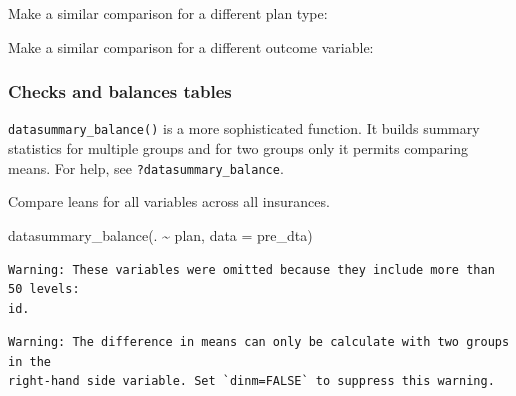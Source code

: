 \documentclass[
  letterpaper,
  DIV=11,
  numbers=noendperiod]{scrartcl}
\newenvironment{Shaded}{\begin{snugshade}}{\end{snugshade}}
\newcommand{\AttributeTok}[1]{\textcolor[rgb]{0.40,0.45,0.13}{#1}}
\newcommand{\FunctionTok}[1]{\textcolor[rgb]{0.28,0.35,0.67}{#1}}
\newcommand{\NormalTok}[1]{\textcolor[rgb]{0.00,0.23,0.31}{#1}}
\newcommand{\SpecialCharTok}[1]{\textcolor[rgb]{0.37,0.37,0.37}{#1}}
\begin{document}
Make a similar comparison for a different plan type:

Make a similar comparison for a different outcome variable:

\hypertarget{checks-and-balances-tables}{%
\subsubsection{Checks and balances
tables}\label{checks-and-balances-tables}}

\texttt{datasummary\_balance()} is a more sophisticated function. It
builds summary statistics for multiple groups and for two groups only it
permits comparing means. For help, see \texttt{?datasummary\_balance}.

Compare leans for all variables across all insurances.

\begin{Shaded}
\begin{Highlighting}[]
\FunctionTok{datasummary\_balance}\NormalTok{(. }\SpecialCharTok{\textasciitilde{}}\NormalTok{ plan, }\AttributeTok{data =}\NormalTok{ pre\_dta)}
\end{Highlighting}
\end{Shaded}

\begin{verbatim}
Warning: These variables were omitted because they include more than 50 levels:
id.
\end{verbatim}

\begin{verbatim}
Warning: The difference in means can only be calculate with two groups in the
right-hand side variable. Set `dinm=FALSE` to suppress this warning.
\end{verbatim}
\end{document}
